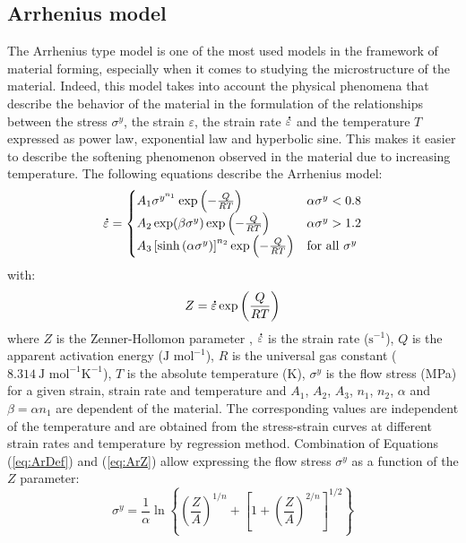 \documentclass[twoside,english,1p,final,sort&compress]{elsarticle}
\theoremstyle{plain}
\newcommand{\mdot}[1]{\accentset{\mbox{\bfseries .}}{#1}}
\newcommand{\ps}{\text{s}^{-1}}
\begin{document}
\subsection{Arrhenius model\label{sec:ARmodel}}

The Arrhenius type model \cite{Sellars-1966} is one of the most used models in the framework of material forming, especially when it comes to studying the microstructure of the material.
Indeed, this model takes into account the physical phenomena that describe the behavior of the material in the formulation of the relationships between the stress $\sigma^y$, the strain $\varepsilon$, the strain rate $\mdot\varepsilon$ and the temperature $T$ expressed as power law, exponential law and hyperbolic sine.
This makes it easier to describe the softening phenomenon observed in the material due to increasing temperature.
The following equations describe the Arrhenius model:
\begin{equation}
\mdot\varepsilon =
\begin{cases}
A_1 \sigma^{y^{n_1}} \exp{\left(-\frac{Q}{RT}\right)} & \alpha\sigma^y < 0.8\\
A_2 \exp(\beta\sigma^y) \exp{\left(-\frac{Q}{RT}\right)} & \alpha\sigma^y > 1.2\\
A_3 \left[\sinh{\left(\alpha\sigma^y\right)}\right]^{n_2} \exp{\left(-\frac{Q}{RT}\right)} & \text{for all }\sigma^y
\end{cases}
\label{eq:ArDef}
\end{equation}
with:
\begin{equation}
Z = \mdot\varepsilon \exp{\left(\frac{Q}{RT}\right)} \label{eq:ArZ}
\end{equation}
where $Z$ is the Zenner-Hollomon parameter \cite{Zener-1944}, $\mdot\varepsilon$ is the strain rate ($\ps$), $Q$ is the apparent activation energy ($\text{J~mol}^{-1}$), $R$ is the universal gas constant ($8.314~\text{J~mol}^{-1} \text{K}^{-1}$), $T$ is the absolute temperature (K), $\sigma^y$ is the flow stress (MPa) for a given strain, strain rate and temperature and $A_1$, $A_2$, $A_3$, $n_1$, $n_2$, $\alpha$ and $\beta=\alpha n_1$ are dependent of the material.
The corresponding values are independent of the temperature and are obtained from the stress-strain curves at different strain rates and temperature by regression method.
Combination of Equations (\ref{eq:ArDef}) and (\ref{eq:ArZ}) allow expressing the flow stress $\sigma^y$ as a function of the $Z$ parameter:
\begin{equation}
\sigma^y = \frac{1}{\alpha} \ln\left\{\left(\frac{Z}{A}\right)^{1/n} + \left[1 + \left(\frac{Z}{A}\right)^{2/n}\right]^{1/2}\right\}
\end{equation}
\end{document}
